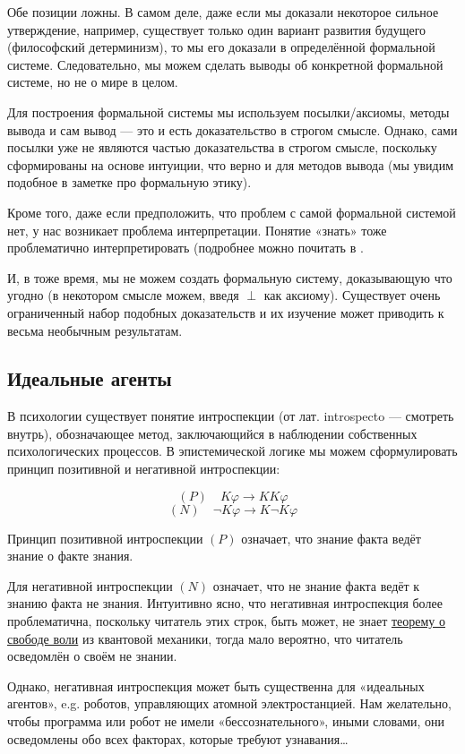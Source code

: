 \documentclass[openany]{book}
\theoremstyle{plain}
\theoremstyle{definition}
\begin{document}
Обе позиции ложны. В самом деле, даже если мы доказали некоторое сильное утверждение, например, существует только один вариант развития будущего (философский детерминизм), то мы его доказали в определённой формальной системе. Следовательно, мы можем сделать выводы об конкретной формальной системе, но не о мире в целом.

Для построения формальной системы мы используем посылки/аксиомы, методы вывода и сам вывод — это и есть доказательство в строгом смысле. Однако, сами посылки уже не являются частью доказательства в строгом смысле, поскольку сформированы на основе интуиции, что верно и для методов вывода (мы увидим подобное в заметке про формальную этику).

Кроме того, даже если предположить, что проблем с самой формальной системой нет, у нас возникает проблема интерпретации. Понятие «знать» тоже проблематично интерпретировать (подробнее можно почитать в \cite{Lewis}.

И, в тоже время, мы не можем создать формальную систему, доказывающую что угодно (в некотором смысле можем, введя \(\perp\) как аксиому). Существует очень ограниченный набор подобных доказательств и их изучение может приводить к весьма необычным результатам.

\subsection{ Идеальные агенты }

В психологии существует понятие интроспекции (от лат. introspecto — смотреть внутрь), обозначающее метод, заключающийся в наблюдении собственных психологических процессов. В эпистемической логике мы можем сформулировать принцип позитивной и негативной интроспекции:

$$(P) \quad K \varphi \to K K \varphi$$
$$(N) \quad \neg K \varphi \to K \neg K \varphi$$

Принцип позитивной интроспекции \((P)\) означает, что знание факта ведёт знание о факте знания.

Для негативной интроспекции \((N)\) означает, что не знание факта ведёт к знанию факта не знания. Интуитивно ясно, что негативная интроспекция более проблематична, поскольку читатель этих строк, быть может, не знает \href{https://ru.wikipedia.org/wiki/Теорема_о_свободе_воли}{теорему о свободе воли} из квантовой механики, тогда мало вероятно, что читатель осведомлён о своём не знании. 

Однако, негативная интроспекция может быть существенна для «идеальных агентов», e.g. роботов, управляющих атомной электростанцией. Нам желательно, чтобы программа или робот не имели «бессознательного», иными словами, они осведомлены обо всех факторах, которые требуют узнавания\dots
\end{document}
